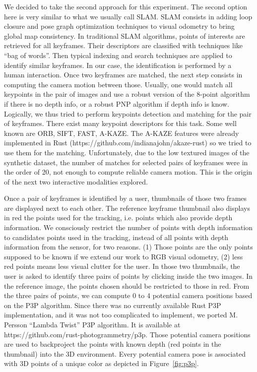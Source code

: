 We decided to take the second approach for this experiment.
The second option here is very similar to what we usually call SLAM.
SLAM consists in adding loop closure and pose graph optimization techniques
to visual odometry to bring global map consistency.
In traditional SLAM algorithms, points of interests are retrieved for all keyframes.
Their descriptors are classified with techniques like ``bag of words''.
Then typical indexing and search techniques are applied to identify similar keyframes.
In our case, the identification is performed by a human interaction.
Once two keyframes are matched, the next step consists in computing
the camera motion between those.
Usually, one would match all keypoints in the pair of images
and use a robust version of the 8-point algorithm if there is no depth info,
or a robust PNP algorithm if depth info is know.
Logically, we thus tried to perform keypoints detection and matching for the pair of keyframes.
There exist many keypoint descriptors for this task.
Some well known are ORB, SIFT, FAST, A-KAZE.
The A-KAZE features were already implemented in Rust (https://github.com/indianajohn/akaze-rust)
so we tried to use them for the matching.
Unfortunately, due to the low textured images of the synthetic dataset,
the number of matches for selected pairs of keyframes were in the order of 20,
not enough to compute reliable camera motion.
This is the origin of the next two interactive modalities explored.

Once a pair of keyframes is identified by a user,
thumbnails of those two frames are displayed next to each other.
The reference keyframe thumbnail also displays in red the points used for the tracking,
i.e. points which also provide depth information.
We consciously restrict the number of points with depth information to candidates
points used in the tracking, instead of all points with depth information from the sensor,
for two reasons.
(1) Those points are the only points supposed to be known if we extend our work to RGB visual odometry,
(2) less red points means less visual clutter for the user.
In those two thumbnails, the user is asked to identify three pairs of points
by clicking inside the two images.
In the reference image, the points chosen should be restricted to those in red.
From the three pairs of points, we can compute 0 to 4 potential camera positions
based on the P3P algorithm.
Since there was no currently available Rust P3P implementation,
and it was not too complicated to implement, we ported M. Persson ``Lambda Twist''
P3P algorithm. It is available at https://github.com/rust-photogrammetry/p3p.
Those potential camera positions are used to backproject the points with known depth
(red points in the thumbnail) into the 3D environment.
Every potential camera pose is associated with 3D points of a unique color
as depicted in Figure~\ref{fig:p3p}.

